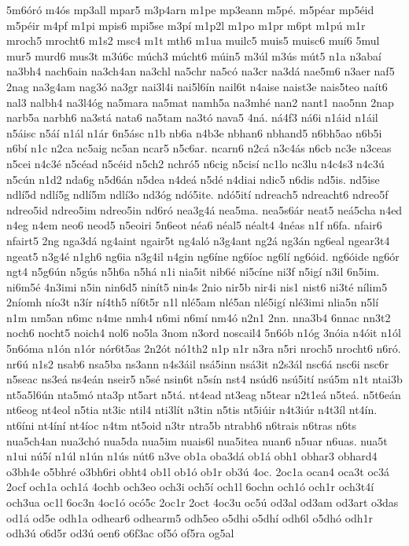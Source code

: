 {5m6óró
m4ós
mp3all
mpar5
m3p4arn
m1pe
mp3eann
m5pé.
m5péar
mp5éid
m5péir
m4pf
m1pi
mpis6
mpi5se
m3pí
m1p2l
m1po
m1pr
m6pt
m1pú
m1r
mroch5
mrocht6
m1s2
msc4
m1t
mth6
m1ua
muilc5
muis5
muisc6
muí6
5mul
mur5
murd6
mus3t
m3ú6c
múch3
múcht6
múin5
m3úl
m3ús
mút5
n1a
n3abaí
na3bh4
nach6ain
na3ch4an
na3chl
na5chr
na5có
na3cr
na3dá
nae5m6
n3aer
naf5
2nag
na3g4am
nag3ó
na3gr
nai3l4i
nai5l6ín
nail6t
n4aise
naist3e
nais5teo
naít6
nal3
nalbh4
na3l4óg
na5mara
na5mat
namh5a
na3mhé
nan2
nant1
nao5nn
2nap
narb5a
narbh6
na3stá
nata6
na5tam
na3tó
nava5
4ná.
ná4f3
ná6i
n1áid
n1áil
n5áisc
n5áí
n1ál
n1ár
6n5ásc
n1b
nb6a
n4b3e
nbhan6
nbhand5
n6bh5ao
n6b5i
n6bí
n1c
n2ca
nc5aig
nc5an
ncar5
n5c6ar.
ncarn6
n2cá
n3c4ás
n6cb
nc3e
n3ceas
n5cei
n4c3é
n5céad
n5céid
n5ch2
nchró5
n6cig
n5cisí
nc1lo
nc3lu
n4c4s3
n4c3ú
n5cún
n1d2
nda6g
n5d6án
n5dea
n4deá
n5dé
n4diai
ndic5
n6dis
nd5is.
nd5ise
ndlí5d
ndlí5g
ndlí5m
ndlí3o
nd3óg
ndó5ite.
ndó5ití
ndreach5
ndreacht6
ndreo5f
ndreo5id
ndreo5im
ndreo5in
nd6ró
nea3g4á
nea5ma.
nea5s6ár
neat5
neá5cha
n4ed
n4eg
n4em
neo6
neod5
n5eoiri
5n6eot
néa6
néal5
néalt4
4néas
n1f
n6fa.
nfair6
nfairt5
2ng
nga3dá
ng4aint
ngair5t
ng4aló
n3g4ant
ng2á
ng3án
ng6eal
ngear3t4
ngeat5
n3g4é
n1gh6
ng6ia
n3g4il
n4gin
ng6íne
ng6íoc
ng6lí
ng6óid.
ng6óide
ng6ór
ngt4
n5g6ún
n5gús
n5h6a
n5há
n1i
nia5it
nib6é
ni5cíne
ni3f
n5igí
n3il
6n5im.
ni6m5é
4n3imi
n5in
nin6d5
ninít5
nin4s
2nio
nir5b
nir4i
nis1
nist6
ni3té
nílim5
2níomh
nío3t
n3ír
ní4th5
ní6t5r
n1l
nlé5am
nlé5an
nlé5igí
nlé3imi
nlia5n
n5lí
n1m
nm5an
n6mc
n4me
nmh4
n6mi
n6mí
nm4ó
n2n1
2nn.
nna3b4
6nnac
nn3t2
noch6
nocht5
noich4
nol6
no5la
3nom
n3ord
noscail4
5n6ób
n1óg
3nóia
n4óit
n1ól
5n6óma
n1ón
n1ór
nór6t5as
2n2ót
nó1th2
n1p
n1r
n3ra
n5ri
nroch5
nrocht6
n6ró.
nr6ú
n1s2
nsab6
nsa5ba
ns3ann
n4s3áil
nsá5inn
nsá3it
n2s3ál
nsc6á
nsc6i
nsc6r
n5seac
ns3eá
ns4eán
nseir5
n5sé
nsin6t
n5sín
nst4
nsúd6
nsú5ití
nsú5m
n1t
ntai3b
nt5a5l6ún
nta5mó
nta3p
nt5art
n5tá.
nt4ead
nt3eag
n5tear
n2t1eá
n5teá.
n5t6eán
nt6eog
nt4eol
n5tia
nt3ic
ntil4
nti3lít
n3tin
n5tis
nt5iúir
n4t3iúr
n4t3íl
nt4ín.
nt6íni
nt4íní
nt4íoc
n4tm
nt5oid
n3tr
ntra5b
ntrabh6
n6trais
n6tras
n6ts
nua5ch4an
nua3chó
nua5da
nua5im
nuais6l
nua5itea
nuan6
n5uar
n6uas.
nua5t
n1ui
nú5í
n1úl
n1ún
n1ús
nút6
n3ve
ob1a
oba3dá
ob1á
obh1
obhar3
obhard4
o3bh4e
o5bhré
o3bh6ri
obht4
ob1l
ob1ó
ob1r
ob3ú
4oc.
2oc1a
ocan4
oca3t
oc3á
2ocf
och1a
och1á
4ochb
och3eo
och3i
och5í
och1l
6ochn
och1ó
och1r
och3t4í
och3ua
oc1l
6oc3n
4oc1ó
ocó5c
2oc1r
2oct
4oc3u
oc5ú
od3al
od3am
od3art
o3das
od1á
od5e
odh1a
odhear6
odhearm5
odh5eo
o5dhi
o5dhí
odh6l
o5dhó
odh1r
odh3ú
o6d5r
od3ú
oen6
o6f3ac
of5ó
of5ra
og5al
}
